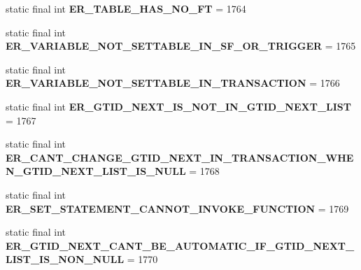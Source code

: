 \begin{DoxyCompactItemize}
static final int {\bfseries E\+R\+\_\+\+T\+A\+B\+L\+E\+\_\+\+H\+A\+S\+\_\+\+N\+O\+\_\+\+FT} = 1764
\item 
\mbox{\label{classcom_1_1mysql_1_1jdbc_1_1_mysql_error_numbers_aaef249069170235352e5d620f6990ec5}} 
static final int {\bfseries E\+R\+\_\+\+V\+A\+R\+I\+A\+B\+L\+E\+\_\+\+N\+O\+T\+\_\+\+S\+E\+T\+T\+A\+B\+L\+E\+\_\+\+I\+N\+\_\+\+S\+F\+\_\+\+O\+R\+\_\+\+T\+R\+I\+G\+G\+ER} = 1765
\item 
\mbox{\label{classcom_1_1mysql_1_1jdbc_1_1_mysql_error_numbers_adfcd574256024c00d545ed6bd3168986}} 
static final int {\bfseries E\+R\+\_\+\+V\+A\+R\+I\+A\+B\+L\+E\+\_\+\+N\+O\+T\+\_\+\+S\+E\+T\+T\+A\+B\+L\+E\+\_\+\+I\+N\+\_\+\+T\+R\+A\+N\+S\+A\+C\+T\+I\+ON} = 1766
\item 
\mbox{\label{classcom_1_1mysql_1_1jdbc_1_1_mysql_error_numbers_a86afe0bbf2485fc84eb4788de94200cf}} 
static final int {\bfseries E\+R\+\_\+\+G\+T\+I\+D\+\_\+\+N\+E\+X\+T\+\_\+\+I\+S\+\_\+\+N\+O\+T\+\_\+\+I\+N\+\_\+\+G\+T\+I\+D\+\_\+\+N\+E\+X\+T\+\_\+\+L\+I\+ST} = 1767
\item 
\mbox{\label{classcom_1_1mysql_1_1jdbc_1_1_mysql_error_numbers_afee16cb0b0ebfabbfbd729ae6e492518}} 
static final int {\bfseries E\+R\+\_\+\+C\+A\+N\+T\+\_\+\+C\+H\+A\+N\+G\+E\+\_\+\+G\+T\+I\+D\+\_\+\+N\+E\+X\+T\+\_\+\+I\+N\+\_\+\+T\+R\+A\+N\+S\+A\+C\+T\+I\+O\+N\+\_\+\+W\+H\+E\+N\+\_\+\+G\+T\+I\+D\+\_\+\+N\+E\+X\+T\+\_\+\+L\+I\+S\+T\+\_\+\+I\+S\+\_\+\+N\+U\+LL} = 1768
\item 
\mbox{\label{classcom_1_1mysql_1_1jdbc_1_1_mysql_error_numbers_ae8fd77cbd4675bd7c5577cbe37ba7b26}} 
static final int {\bfseries E\+R\+\_\+\+S\+E\+T\+\_\+\+S\+T\+A\+T\+E\+M\+E\+N\+T\+\_\+\+C\+A\+N\+N\+O\+T\+\_\+\+I\+N\+V\+O\+K\+E\+\_\+\+F\+U\+N\+C\+T\+I\+ON} = 1769
\item 
\mbox{\label{classcom_1_1mysql_1_1jdbc_1_1_mysql_error_numbers_aac6aab684bca60de8bd47dacc8fd65e8}} 
static final int {\bfseries E\+R\+\_\+\+G\+T\+I\+D\+\_\+\+N\+E\+X\+T\+\_\+\+C\+A\+N\+T\+\_\+\+B\+E\+\_\+\+A\+U\+T\+O\+M\+A\+T\+I\+C\+\_\+\+I\+F\+\_\+\+G\+T\+I\+D\+\_\+\+N\+E\+X\+T\+\_\+\+L\+I\+S\+T\+\_\+\+I\+S\+\_\+\+N\+O\+N\+\_\+\+N\+U\+LL} = 1770

\end{DoxyCompactItemize}
